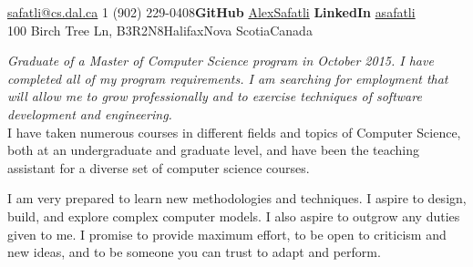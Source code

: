 \documentclass[10pt,a4paper]{article}
\begin{document}
 

\noindent\href{mailto:safatli@cs.dal.ca}{safatli@cs.dal.ca}\bull
\textsmaller{+}1 (902) 229-0408\bull \textbf{GitHub} \href{https://github.com/AlexSafatli/}{AlexSafatli}\bull
\textbf{LinkedIn} \href{http://ca.linkedin.com/in/asafatli}{asafatli}\\
100 Birch Tree Ln, B3R2N8\bull Halifax\bull Nova Scotia\bull Canada
\spacedhrule{0.9em}{-0.4em} %

\vspace{-1.3em}
\begin{multicols}{2}
\noindent \textit{Graduate of a Master of Computer Science program in October 2015. I have completed all of my program requirements. I am searching for employment that will allow me to grow professionally and to exercise techniques of software development and engineering.}\\

I have taken numerous courses in different fields and topics of Computer Science, both at an undergraduate and graduate level, and have been the teaching assistant for a diverse set of computer science courses. 

I am very prepared to learn new methodologies and techniques. I aspire to design, build, and explore complex computer models. I also aspire to outgrow any duties given to me. I promise to provide maximum effort, to be open to criticism and new ideas, and to be someone you can trust to adapt and perform.
\end{multicols}
\spacedhrule{0.5em}{-0.4em} %
\end{document}
